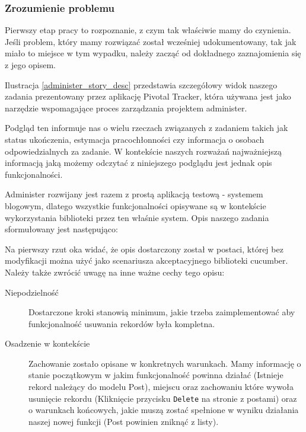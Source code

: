     \subsubsection{Zrozumienie problemu}
    Pierwszy etap pracy to rozpoznanie, z czym tak właściwie mamy do czynienia. Jeśli problem, który mamy rozwiązać został wcześniej udokumentowany, tak jak miało to miejsce w tym wypadku, należy zacząć od dokładnego zaznajomienia się z jego opisem.
    
    Ilustracja \ref{administer_story_desc} przedstawia szczegółowy widok naszego zadania prezentowany przez aplikację Pivotal Tracker, która używana jest jako narzędzie wspomagające proces zarządzania projektem administer.
    
    Podgląd ten informuje nas o wielu rzeczach związanych z zadaniem takich jak status ukończenia, estymacja pracochłonności czy informacja o osobach odpowiedzialnych za zadanie. W kontekście naszych rozważań najważniejszą informacją jaką możemy odczytać z niniejszego podglądu jest jednak opis funkcjonalności. 
    
    Administer rozwijany jest razem z prostą aplikacją testową - systemem blogowym, dlatego wszystkie funkcjonalności opisywane są w kontekście wykorzystania biblioteki przez ten właśnie system. Opis naszego zadania sformułowany jest następująco:
    
    
    
    Na pierwszy rzut oka widać, że opis dostarczony został w postaci, której bez modyfikacji można użyć jako scenariusza akceptacyjnego biblioteki cucumber. Należy także zwrócić uwagę na inne ważne cechy tego opisu:
    
    \begin{description}
      \item[Niepodzielność] Dostarczone kroki stanowią minimum, jakie trzeba zaimplementować aby funkcjonalność usuwania rekordów była kompletna.
      \item[Osadzenie w kontekście] Zachowanie zostało opisane w konkretnych warunkach. Mamy informację o stanie początkowym w jakim funkcjonalność powinna działać (Istnieje rekord należący do modelu Post), miejscu oraz zachowaniu które wywoła usunięcie rekordu (Kliknięcie przycisku \verb+Delete+ na stronie z postami) oraz o warunkach końcowych, jakie muszą zostać spełnione w wyniku działania naszej nowej funkcji (Post powinien zniknąć z listy).
    \end{description}
    

